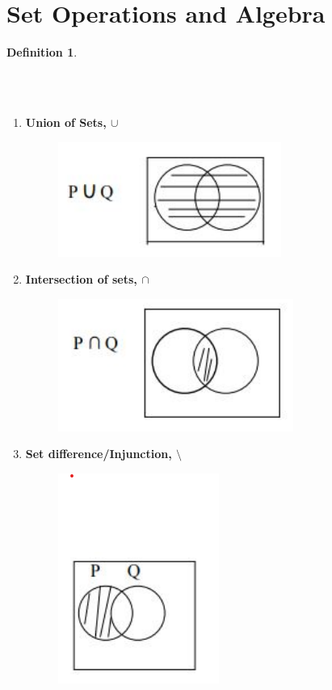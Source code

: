 \documentclass[12pt]{report}
\newtheorem{definition}{Definition}
\begin{document}
\section*{Set Operations and Algebra}
    \begin{definition}
    \end{definition}

    \\

    \\
    \begin{enumerate}
        \item \textbf{Union of Sets, $\cup$} \\
            \begin{figure}[h!]
                \includegraphics[width=0.4\linewidth]{union.png}
            \end{figure}
        \item \textbf{Intersection of sets, $\cap$} \\
            \begin{figure}[h!]
                \includegraphics[width=0.4\linewidth]{intersection.png}
            \end{figure}
        \item \textbf{Set difference/Injunction, $\setminus$} \\
            \begin{figure}[h!]
                \includegraphics[width=0.4\linewidth]{set_difference.png}

\end{figure}
\end{enumerate}
\end{document}
